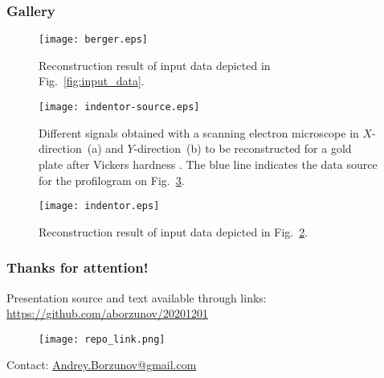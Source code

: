 \documentclass{beamer}
\begin{document}

\begin{frame}[allowframebreaks]
    \frametitle{Gallery}

    \begin{figure}
        \texttt{[image: berger.eps]}
        \caption{Reconstruction result of input data depicted in Fig.~\ref{fig:input_data}.}
        {\label{fig:berger}}%
    \end{figure}

\newpage

    \begin{figure}
        \texttt{[image: indentor-source.eps]}
        \caption{Different signals obtained with a scanning electron microscope in $X$-direction~(a) and $Y$-direction~(b) to be reconstructed for a gold plate after Vickers hardness . The blue line indicates the data source for the profilogram on Fig.~\ref{fig:indentor}.}
        {\label{fig:indentor-source}}%
    \end{figure}

\newpage

    \begin{figure}
        \texttt{[image: indentor.eps]}
        \caption{Reconstruction result of input data depicted in Fig.~\ref{fig:indentor-source}.}
        {\label{fig:indentor}}%
    \end{figure}

\end{frame}

\begin{frame}[allowframebreaks]
    
\end{frame}

\begin{frame}
    \frametitle{Thanks for attention!}
    Presentation source and text available through links:
    \url{https://github.com/aborzunov/20201201}
    \begin{figure}
        \texttt{[image: repo\_link.png]}
    \end{figure}
     Contact: \url{Andrey.Borzunov@gmail.com}

\end{frame}
\end{document}

